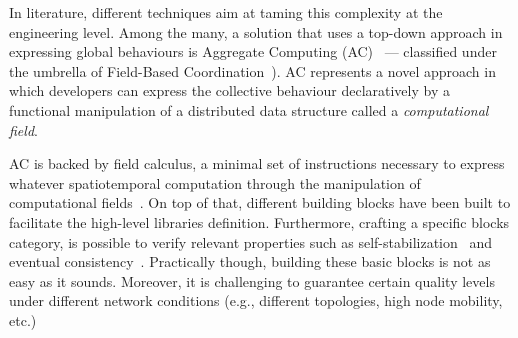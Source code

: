 \documentclass[conference]{IEEEtran}
\begin{document}
In literature, different techniques aim at taming this complexity at the engineering level.
%
Among the many, a solution that uses a top-down approach in expressing global behaviours is Aggregate Computing (AC)~\cite{DBLP:journals/computer/BealPV15} --- classified under the umbrella of Field-Based Coordination~\cite{DBLP:books/daglib/0015276}).
%
AC represents a novel approach in which developers can express the collective behaviour declaratively by a functional manipulation of a distributed data structure called a \emph{computational field}.

AC is backed by field calculus, a minimal set of instructions necessary to express whatever spatiotemporal computation through the manipulation of computational fields~\cite{DBLP:conf/coordination/AudritoBDV18}. 
%
On top of that, different building blocks have been built to facilitate the high-level libraries definition.
%
Furthermore, crafting a specific blocks category, is possible to verify relevant properties such as self-stabilization~\cite{DBLP:conf/coordination/ViroliD14} and eventual consistency~\cite{DBLP:conf/saso/BealVPD16}.
%
Practically though, building these basic blocks is not as easy as it sounds. 
%
Moreover, it is challenging to guarantee certain quality levels under different network conditions (e.g., different topologies, high node mobility, etc.)
\end{document}
